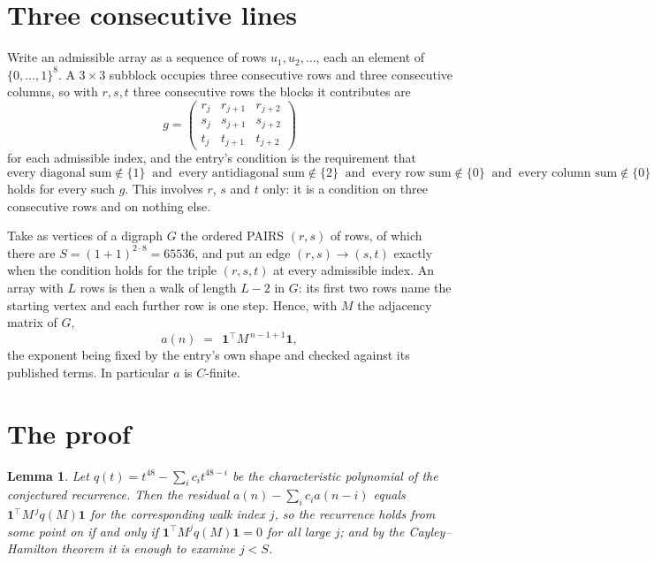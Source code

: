 \documentclass[11pt,a4paper]{article}
\theoremstyle{plain}
\newtheorem{lemma}[theorem]{Lemma}
\theoremstyle{definition}
\begin{document}
\section{Three consecutive lines}

Write an admissible array as a sequence of rows $u_1,u_2,\dots$, each an element of
$\{0,\dots,1\}^{8}$. A $3\times3$ subblock occupies three consecutive rows and
three consecutive columns, so with $r,s,t$ three consecutive rows the blocks it
contributes are
\[
g=\begin{pmatrix}r_j&r_{j+1}&r_{j+2}\\ s_j&s_{j+1}&s_{j+2}\\ t_j&t_{j+1}&t_{j+2}\end{pmatrix}
\]
for each admissible index, and the entry's condition is the requirement that
\[
\text{every diagonal sum} \notin \{1\}\ \text{ and }\ \text{every antidiagonal sum} \notin \{2\}\ \text{ and }\ \text{every row sum} \notin \{0\}\ \text{ and }\ \text{every column sum} \notin \{0\}
\]
holds for every such $g$. This involves $r$, $s$ and $t$ only: it is a condition on
three consecutive rows and on nothing else.

Take as vertices of a digraph $G$ the ordered PAIRS $(r,s)$ of rows, of which there are
$S=(1+1)^{2\cdot8}=65536$, and put an edge $(r,s)\to(s,t)$ exactly when the condition
holds for the triple $(r,s,t)$ at every admissible index. An array with $L$ rows is then a
walk of length $L-2$ in $G$: its first two rows name the starting vertex and each further
row is one step. Hence, with $M$ the adjacency matrix of $G$,
\[
a(n)\;=\;\,\mathbf{1}^{\!\top}M^{\,n-1+1}\mathbf{1},
\]
the exponent being fixed by the entry's own shape and checked against its published terms.
In particular $a$ is $C$-finite.

\section{The proof}

\begin{lemma}\label{lem:crit}
Let $q(t)=t^{48}-\sum_i c_it^{48-i}$ be the characteristic polynomial of the
conjectured recurrence. Then the residual $a(n)-\sum_ic_ia(n-i)$ equals
$\mathbf{1}^{\!\top}M^{\,j}q(M)\mathbf{1}$ for the corresponding walk index
$j$, so the recurrence holds from some point on if and only if
$\mathbf{1}^{\!\top}M^{j}q(M)\mathbf{1}=0$ for all large $j$; and by the
Cayley--Hamilton theorem it is enough to examine $j<S$.
\end{lemma}
\end{document}

